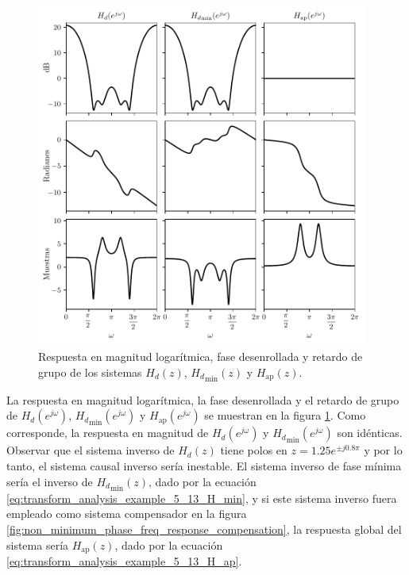\documentclass[a4paper]{report}
\begin{document}
\begin{figure}[!htb]
 \begin{center}
 \includegraphics[width=0.97\textwidth]{figuras/example_5_13_H_freq_responses.pdf}
 \caption{\label{fig:transform_analysis_example_5_13_H_freq_responses} Respuesta en magnitud logarítmica, fase desenrollada y retardo de grupo de los sistemas \(H_d(z)\), \({H_d}_\textrm{min}(z)\) y \(H_\textrm{ap}(z)\).}
 \end{center}
\end{figure}
La respuesta en magnitud logarítmica, la fase desenrollada y el retardo de grupo de \(H_d(e^{j\omega})\), \({H_d}_\textrm{min}(e^{j\omega})\) y \(H_\textrm{ap}(e^{j\omega})\) se muestran en la figura \ref{fig:transform_analysis_example_5_13_H_freq_responses}. Como corresponde, la respuesta en magnitud de \(H_d(e^{j\omega})\) y \({H_d}_\textrm{min}(e^{j\omega})\) son idénticas.
Observar que el sistema inverso de \(H_d(z)\) tiene polos en \(z=1.25e^{\pm j0.8\pi}\) y por lo tanto, el sistema causal inverso sería inestable. El sistema inverso de fase mínima sería el inverso de \({H_d}_\textrm{min}(z)\), dado por la ecuación \ref{eq:transform_analysis_example_5_13_H_min}, y si este sistema inverso fuera empleado como sistema compensador en la figura \ref{fig:non_minimum_phase_freq_response_compensation}, la respuesta global del sistema sería \(H_\textrm{ap}(z)\), dado por la ecuación \ref{eq:transform_analysis_example_5_13_H_ap}.
\end{document}
